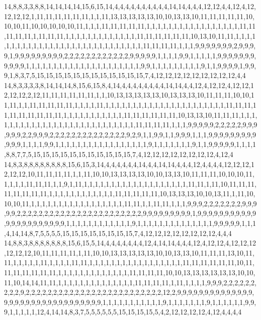 14,8,8,3,3,8,8,14,14,14,14,15,6,15,14,4,4,4,4,4,4,4,4,4,4,14,14,4,4,4,12,12,4,4,12,4,12,12,12,12,1,11,11,11,11,11,11,1,1,11,13,13,13,13,13,10,10,13,13,10,11,11,11,11,11,10,10,10,11,10,10,10,10,10,11,1,1,1,11,11,11,11,11,1,1,1,1,1,1,1,1,1,1,1,1,1,1,1,1,1,11,11,11,11,11,1,11,11,11,1,1,1,1,1,1,1,1,1,1,1,1,1,11,11,11,11,11,11,10,13,10,11,11,1,1,1,1,1,1,1,1,1,1,1,1,1,1,1,1,1,1,1,1,1,1,1,1,1,1,1,1,1,11,11,11,11,1,1,1,9,9,9,9,9,9,9,2,9,9,9,9,1,9,9,9,9,9,9,9,9,9,2,2,2,2,2,2,2,2,2,2,2,2,9,9,9,9,9,1,1,1,1,9,9,1,1,1,1,1,9,9,9,9,9,9,9,9,9,9,9,1,1,1,1,1,1,1,1,1,1,1,1,1,1,1,1,1,1,1,1,1,9,9,1,1,1,1,1,1,1,1,1,9,1,1,9,9,9,9,1,9,9,9,1,8,3,7,5,15,15,15,15,15,15,15,15,15,15,15,15,7,4,12,12,12,12,12,12,12,12,12,4,4
14,8,3,3,3,3,8,14,14,14,8,15,6,15,8,4,14,4,4,4,4,4,4,4,4,14,14,4,4,12,4,12,12,4,12,12,12,12,12,2,12,11,11,11,11,11,11,1,1,10,13,13,13,13,13,10,13,13,13,10,11,11,11,10,10,11,11,1,1,11,11,11,11,11,1,1,1,1,11,1,1,1,1,1,1,1,1,1,1,1,1,1,1,1,1,1,1,1,1,1,1,11,11,11,11,11,11,11,11,11,11,1,1,1,1,1,1,1,1,1,1,1,11,11,11,11,11,11,10,13,13,10,11,11,11,1,1,1,1,1,1,1,1,1,1,1,1,1,1,1,1,1,1,1,1,1,1,1,1,1,1,1,11,11,11,11,1,1,1,9,9,9,9,9,2,2,2,2,2,9,9,9,9,9,9,2,2,9,9,9,2,2,2,2,2,2,2,2,2,2,2,2,2,2,9,2,9,1,1,9,9,1,1,9,9,9,1,1,1,9,9,9,9,9,9,9,9,9,9,9,9,1,1,1,1,9,9,1,1,1,1,1,1,1,1,1,1,1,1,1,1,1,1,1,9,1,1,1,1,1,1,1,9,1,1,9,9,9,9,9,1,1,1,1,8,8,7,7,5,15,15,15,15,15,15,15,15,15,15,15,7,4,12,12,12,12,12,12,12,12,4,12,4
14,8,3,8,8,8,8,8,8,8,8,15,6,15,3,14,4,4,4,4,4,4,14,4,4,14,14,4,4,4,12,4,4,4,4,12,12,12,12,12,12,10,11,11,11,11,1,1,11,10,10,13,13,13,13,10,10,13,13,10,11,11,11,10,10,10,11,1,1,1,1,11,11,11,1,1,9,1,11,1,1,1,1,1,1,1,1,1,1,1,1,1,1,1,1,1,1,1,11,11,1,11,10,11,11,11,11,11,11,11,11,1,1,1,1,1,1,1,1,1,1,1,1,11,11,11,11,11,10,13,13,13,10,10,13,11,1,11,10,10,10,11,1,1,1,1,1,1,1,1,1,1,1,1,1,1,1,1,1,11,11,1,1,11,11,1,1,1,9,9,9,2,2,2,2,2,2,2,9,9,9,9,9,2,2,2,2,2,2,2,2,2,2,2,2,2,2,2,2,2,2,2,2,2,2,2,9,9,9,9,9,9,9,9,9,1,9,9,9,9,9,9,9,9,9,9,9,9,9,9,9,9,9,9,9,9,9,9,1,1,1,1,1,1,1,1,1,1,1,1,9,1,1,1,1,1,1,1,1,1,1,1,1,1,1,9,9,9,9,9,1,1,1,4,14,14,8,7,5,5,5,5,15,15,15,15,15,15,15,15,7,4,12,12,12,12,12,12,12,12,4,4,4
14,8,8,3,8,8,8,8,8,8,8,15,6,15,5,14,4,4,4,4,4,4,4,12,4,14,14,4,4,4,12,4,12,12,4,12,12,12,12,12,12,10,11,11,11,11,1,11,10,10,13,13,13,13,13,10,10,13,13,10,11,11,11,13,10,11,11,1,1,1,1,1,11,1,1,1,1,11,11,1,1,1,1,1,1,1,1,1,1,1,1,1,1,1,1,1,11,11,11,11,11,11,10,11,11,11,11,11,11,11,1,1,1,1,1,1,1,1,1,1,1,1,1,11,11,11,11,10,10,13,13,13,13,13,13,10,10,11,10,14,14,11,11,1,1,1,1,1,1,1,1,1,1,1,1,1,1,11,11,11,11,1,11,1,1,1,1,9,9,9,2,2,2,2,2,2,2,2,2,9,2,2,2,2,2,2,2,2,2,2,2,2,2,2,2,2,2,2,2,2,2,2,2,2,2,12,2,9,9,9,9,9,9,9,9,9,9,9,9,9,9,9,9,9,9,9,9,9,9,9,9,9,9,9,9,9,9,9,9,1,1,1,1,1,1,1,1,1,1,1,9,1,1,1,1,1,1,1,9,1,1,1,1,1,1,9,9,9,1,1,1,1,1,12,4,14,14,8,3,7,5,5,5,5,5,5,15,15,15,15,5,4,2,12,12,12,12,4,12,4,4,4,4
